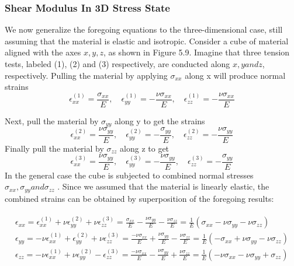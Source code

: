 \subsubsection{Shear Modulus In 3D Stress State}
We now generalize the foregoing equations to the three-dimensional case, still assuming that the
material is elastic and isotropic. Consider a cube of material aligned with the axes ${x, y, z}$, as
shown in Figure 5.9. Imagine that three tension tests, labeled (1), (2) and (3) respectively, are
conducted along $x, y and z$, respectively. Pulling the material by applying $\sigma_{xx}$ along x will produce
normal strains
\begin{equation}
\epsilon_{xx}^{(1)} = \frac{\sigma_{xx}}{E}, \quad
\epsilon_{yy}^{(1)} = -\frac{\nu\sigma_{xx}}{E}, \quad
\epsilon_{zz}^{(1)} = -\frac{\nu\sigma_{xx}}{E}
\end{equation}

Next, pull the material by $\sigma_{yy}$ along y to get the strains
\begin{equation}
\epsilon_{xx}^{(2)} = \frac{\nu\sigma_{yy}}{E}, \quad
\epsilon_{yy}^{(2)} = -\frac{\sigma_{yy}}{E}, \quad
\epsilon_{zz}^{(2)} = -\frac{\nu\sigma_{yy}}{E}
\end{equation}
Finally pull the material by $\sigma_{zz}$ along z to get
\begin{equation}
\epsilon_{xx}^{(3)} = \frac{\nu\sigma_{yy}}{E}, \quad
\epsilon_{yy}^{(3)} = -\frac{\nu\sigma_{yy}}{E}, \quad
\epsilon_{zz}^{(3)} = -\frac{\sigma_{yy}}{E}
\end{equation}
In the general case the cube is subjected to combined normal stresses $\sigma_{xx} ,\sigma_{yy} and \sigma_{zz}$ . Since we
assumed that the material is linearly elastic, the combined strains can be obtained by superposition
of the foregoing results:

\begin{align}
\begin{split}
\epsilon_{xx} = \epsilon^{(1)}_{xx} + \nu\epsilon^{(2)}_{yy} + \nu\epsilon^{(3)}_{zz} = \frac{\sigma_{xx}}{E} - \frac{\nu\sigma_{yy}}{E} - \frac{\nu\sigma_{zz}}{E} = \frac{1}{E}(\sigma_{xx} - \nu\sigma_{yy} - \nu\sigma_{zz})\\
\epsilon_{yy} = -\nu\epsilon^{(1)}_{xx} + \epsilon^{(2)}_{yy} + \nu\epsilon^{(3)}_{zz} = \frac{-\nu\sigma_{xx}}{E} + \frac{\nu\sigma_{yy}}{E} - \frac{\nu\sigma_{zz}}{E} = \frac{1}{E}(-\sigma_{xx} + \nu\sigma_{yy} - \nu\sigma_{zz})\\
\epsilon_{zz} = -\nu\epsilon^{(1)}_{xx} + \nu\epsilon^{(2)}_{yy} - \epsilon^{(3)}_{zz} = \frac{-\nu\sigma_{xx}}{E} - \frac{\nu\sigma_{yy}}{E} + \frac{\nu\sigma_{zz}}{E} = \frac{1}{E}(-\nu\sigma_{xx} - \nu\sigma_{yy} + \sigma_{zz})
\end{split}
\label{eq:combined}
\end{align}

